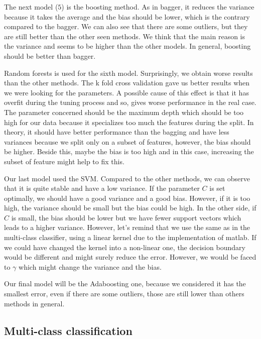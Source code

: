 \documentclass{article} %
\begin{document}
The next model ($5$) is the boosting method. As in bagger, it reduces the variance because it takes the average and the bias should be lower, which is the contrary compared to the bagger. We can also see that there are some outliers, but they are still better than the other seen methods. We think that the main reason is the variance and seems to be higher than the other models. In general, boosting should be better than bagger.

Random forests is used for the sixth model. Surprisingly, we obtain worse results than the other methods. The k fold cross validation gave us better results when we were looking for the parameters. A possible cause of this effect is that it has overfit during the tuning process and so, gives worse performance in the real case. The parameter concerned should be the maximum depth which should be too high for our data because it specializes too much the features during the split. In theory, it should have better performance than the bagging and have less variances because we split only on a subset of features, however, the bias should be higher. Beside this, maybe the bias is too high and in this case, increasing the subset of feature might help to fix this.

Our last model used the SVM. Compared to the other methods, we can observe that it is quite stable and have a low variance. If the parameter $C$ is set optimally, we should have a good variance and a good bias. However, if it is too high, the variance should be small but the bias could be high. In the other side, if $C$ is small, the bias should be lower but we have fewer support vectors which leads to a higher variance. However, let's remind that we use the same as in the multi-class classifier, using a linear kernel due to the implementation of matlab. If we could have changed the kernel into a non-linear one, the decision boundary would be different and might surely reduce the error. However, we would be faced to $\gamma$ which might change the variance and the bias.

Our final model will be the Adaboosting one, because we considered it has the smallest error, even if there are some outliers, those are still lower than others methods in general. 

\subsection{Multi-class classification}
\end{document}
